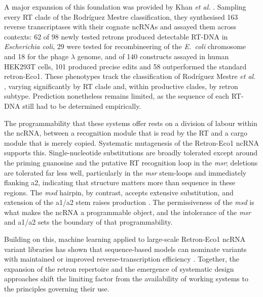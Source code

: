 A major expansion of this foundation was provided by Khan \textit{et al.}
\cite{khan2025}. Sampling every RT clade of the Rodr\'iguez Mestre
classification, they synthesised 163 reverse transcriptases with their cognate
ncRNAs and assayed them across contexts: 62 of 98 newly tested retrons produced
detectable RT-DNA in \textit{Escherichia coli}, 29 were tested for
recombineering of the \textit{E.~coli} chromosome and 18 for the phage $\lambda$
genome, and of 140 constructs assayed in human HEK293T cells, 101 produced
precise edits and 58 outperformed the standard retron-Eco1. These phenotypes
track the classification of Rodr\'iguez Mestre \textit{et al.}
\cite{mestre2020}, varying significantly by RT clade and, within productive
clades, by retron subtype. Prediction nonetheless remains limited, as the
sequence of each RT-DNA still had to be determined empirically.

The programmability that these systems offer rests on a division of labour
within the ncRNA, between a recognition module that is read by the RT and a
cargo module that is merely copied. Systematic mutagenesis of the Retron-Eco1
ncRNA supports this. Single-nucleotide substitutions are broadly tolerated
except around the priming guanosine and the putative RT recognition loop in the
\textit{msr}; deletions are tolerated far less well, particularly in the
\textit{msr} stem-loops and immediately flanking a2, indicating that structure
matters more than sequence in these regions. The \textit{msd} hairpin, by
contrast, accepts extensive substitution, and extension of the a1/a2 stem raises
production \cite{crawford2025}. The permissiveness of the \textit{msd} is what
makes the ncRNA a programmable object, and the intolerance of the \textit{msr}
and a1/a2 sets the boundary of that programmability.

Building on this, machine learning applied to large-scale Retron-Eco1 ncRNA
variant libraries has shown that sequence-based models can nominate variants
with maintained or improved reverse-transcription efficiency
\cite{crawford2025}. Together, the expansion of the retron repertoire and the
emergence of systematic design approaches shift the limiting factor from the
availability of working systems to the principles governing their use.



